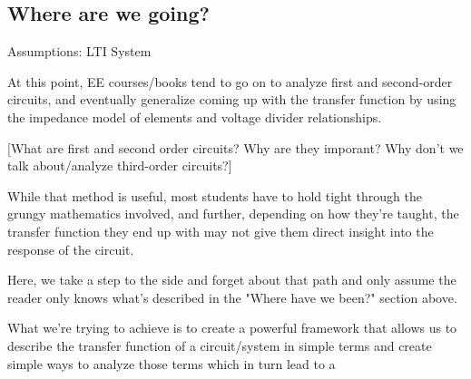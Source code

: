 \documentclass{report}
\begin{document}
\subsection*{Where are we going?}





Assumptions: LTI System


At this point, EE courses/books tend to go on to analyze first and second-order circuits, and eventually generalize coming up with the transfer function by using the impedance model of elements and voltage divider relationships. 

[What are first and second order circuits? Why are they imporant? Why don't we talk about/analyze third-order circuits?]

While that method is useful, most students have to hold tight through the grungy mathematics involved, and further, depending on how they're taught, the transfer function they end up with may not give them direct insight into the response of the circuit. 

Here, we take a step to the side and forget about that path and only assume the reader only knows what's described in the "Where have we been?" section above. 

What we're trying to achieve is to create a powerful framework that allows us to describe the transfer function of a circuit/system in simple terms and create simple ways to analyze those terms which in turn lead to a 
\end{document}
